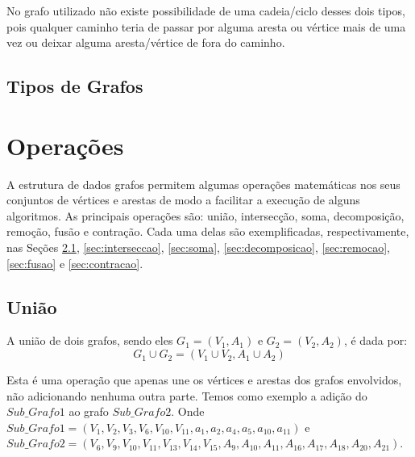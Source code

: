 	No grafo utilizado não existe possibilidade de uma cadeia/ciclo desses dois tipos, pois qualquer caminho teria de passar por alguma aresta ou vértice mais de uma vez ou deixar alguma aresta/vértice de fora do caminho.
	
	
	\section{Tipos de Grafos}\label{sec:tiposGrafos}
	
	
	\chapter{Operações}\label{cap:operacoes}
	
	A estrutura de dados grafos permitem algumas operações matemáticas nos seus conjuntos de vértices e arestas de modo a facilitar a execução de alguns algoritmos. As principais operações são: união, intersecção, soma, decomposição, remoção, fusão e contração. Cada uma delas são exemplificadas, respectivamente, nas Seções \ref{sec:uniao}, \ref{sec:interseccao}, \ref{sec:soma}, \ref{sec:decomposicao}, \ref{sec:remocao}, \ref{sec:fusao} e \ref{sec:contracao}.
	
	\section{União}\label{sec:uniao}
	A união de dois grafos, sendo eles $G_1 = (V_1, A_1)$ e $G_2 = (V_2, A_2)$, é dada por:
	\[
	G_1 \cup G_2 = (V_1 \cup V_2, A_1 \cup A_2)
	\]
	
	Esta é uma operação que apenas une os vértices e arestas dos grafos envolvidos, não adicionando nenhuma outra parte.
	Temos como exemplo a adição do $Sub\_Grafo1$ ao grafo $Sub\_Grafo2$.
	Onde $Sub\_Grafo1 = (V_1, V_2, V_3, V_6, V_{10}, V_{11}, a_1, a_2, a_4, a_5, a_{10}, a_{11} )$ e $Sub\_Grafo2 = (V_6, V_9, V_{10}, V_{11}, V_{13}, V_{14}, V_{15}, A_{9}, A_{10}, A_{11}, A_{16}, A_{17}, A_{18}, A_{20}, A_{21})$.
	
